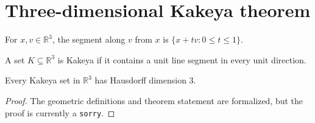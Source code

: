 \section{Three-dimensional Kakeya theorem}

\begin{definition}
\label{def:kakeya-segment}
\leanok
For $x,v\in\mathbb R^3$, the segment along $v$ from $x$ is $\{x+tv:0\le t\le1\}$.
\end{definition}

\begin{definition}
\label{def:kakeya-set}
\leanok
{}
A set $K\subseteq\mathbb R^3$ is Kakeya if it contains a unit line segment in every unit direction.
\end{definition}

\begin{theorem}
\label{thm:kakeya-3d}
\notready
{}
Every Kakeya set in $\mathbb R^3$ has Hausdorff dimension $3$.
\end{theorem}

\begin{proof}
The geometric definitions and theorem statement are formalized, but the proof is currently a \texttt{sorry}.
\end{proof}
